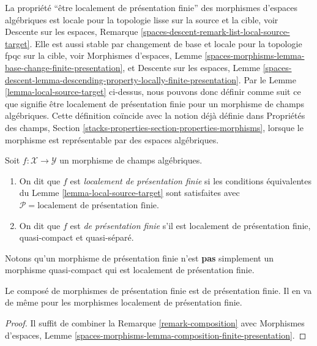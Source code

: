 \noindent
La propriété ``être localement de présentation finie'' des morphismes
d'espaces algébriques est locale pour la topologie lisse sur la source et la
cible, voir Descente sur les espaces, Remarque
\ref{spaces-descent-remark-list-local-source-target}. Elle est aussi stable
par changement de base et locale pour la topologie fpqc sur la cible, voir
Morphismes d'espaces, Lemme
\ref{spaces-morphisms-lemma-base-change-finite-presentation}, et Descente sur
les espaces, Lemme
\ref{spaces-descent-lemma-descending-property-locally-finite-presentation}.
Par le Lemme \ref{lemma-local-source-target} ci-dessus, nous pouvons donc
définir comme suit ce que signifie être localement de présentation finie pour
un morphisme de champs algébriques. Cette définition coïncide avec la notion
déjà définie dans Propriétés des champs,
Section \ref{stacks-properties-section-properties-morphisms}, lorsque le
morphisme est représentable par des espaces algébriques.

\begin{definition}
\label{definition-locally-finite-presentation}
Soit $f : \mathcal{X} \to \mathcal{Y}$ un morphisme de champs algébriques.
\begin{enumerate}
\item On dit que $f$ est {\it localement de présentation finie} si les
conditions équivalentes du Lemme \ref{lemma-local-source-target} sont
satisfaites avec
$\mathcal{P} = \text{localement de présentation finie}$.
\item On dit que $f$ est {\it de présentation finie} s'il est localement de
présentation finie, quasi-compact et quasi-séparé.
\end{enumerate}
\end{definition}

\noindent
Notons qu'un morphisme de présentation finie n'est {\bf pas} simplement un
morphisme quasi-compact qui est localement de présentation finie.

\begin{lemma}
\label{lemma-composition-finite-presentation}
Le composé de morphismes de présentation finie est de présentation finie.
Il en va de même pour les morphismes localement de présentation finie.
\end{lemma}

\begin{proof}
Il suffit de combiner la Remarque \ref{remark-composition} avec Morphismes
d'espaces, Lemme
\ref{spaces-morphisms-lemma-composition-finite-presentation}.
\end{proof}

